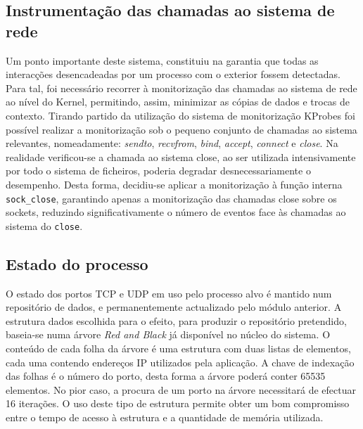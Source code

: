 

\subsection{Instrumentação das chamadas ao sistema de rede}
\label{sub:mon_syscalls}

Um ponto importante deste sistema, constituiu na garantia que todas as interacções desencadeadas por um processo com o exterior fossem detectadas. Para tal, foi necessário recorrer à monitorização das chamadas ao sistema de rede ao nível do Kernel, permitindo, assim, minimizar as cópias de dados e trocas de contexto. Tirando partido da utilização do sistema de monitorização KProbes foi possível realizar a monitorização sob o pequeno conjunto de chamadas ao sistema relevantes, nomeadamente: \textit{sendto}, \textit{recvfrom}, \textit{bind}, \textit{accept}, \textit{connect} e \textit{close}.
 Na realidade verificou-se a chamada ao sistema close, ao ser utilizada intensivamente por todo o sistema de ficheiros, poderia degradar desnecessariamente o desempenho. Desta forma, decidiu-se aplicar a monitorização à função interna \texttt{sock\_close}, garantindo apenas a monitorização das chamadas close sobre os sockets, reduzindo significativamente o número de eventos face às chamadas ao sistema do \texttt{close}.

\subsection{Estado do processo}
\label{sub:data_repository}

O estado dos portos TCP e UDP em uso pelo processo alvo é mantido num repositório de dados, e permanentemente actualizado pelo módulo anterior. 
 A estrutura dados escolhida para o efeito, para produzir o repositório pretendido, baseia-se numa árvore \textit{Red and Black} já disponível no núcleo do sistema. O conteúdo de cada folha da árvore é uma estrutura com duas listas de elementos, cada uma contendo endereços IP utilizados pela aplicação. A chave de indexação das folhas é o número do porto, desta forma a árvore poderá conter 65535 elementos. No pior caso, a procura de um porto na árvore necessitará de efectuar 16 iterações.
  O uso deste tipo de estrutura permite obter um bom compromisso entre o tempo de acesso à estrutura e a quantidade de memória utilizada.


